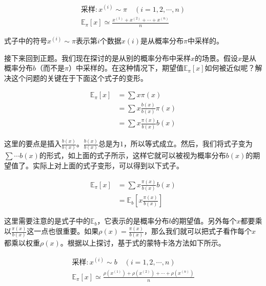 \documentclass[lang=cn,newtx,10pt,scheme=chinese]{elegantbook}
\begin{document}
\begin{equation}
\begin{aligned}
\text{采样}: x^{(i)}\sim\pi\quad (i=1,2,\cdots,n) \\
\mathbb{E}_\pi[x]\simeq\frac{x^{(1)}+x^{(2)}+\cdots+x^{(n)}}{n}
\end{aligned}
\end{equation}

式子中的符号$x^{(i)}\sim\pi$表示第$i$个数据$x(i)$是从概率分布$\pi$中采样的。

接下来回到正题。我们现在探讨的是从别的概率分布中采样$x$的场景。假设$x$是从概率分布$b$（而不是$\pi$）中采样的。在这种情况下，期望值$\mathbb{E}_\pi[x]$如何被近似呢？解决这个问题的关键在于下面这个式子的变形。

\begin{equation}
\begin{aligned}
\mathbb{E}_\pi[x] &= \sum x\pi(x) \\
&= \sum x \frac{b(x)}{b(x)}\pi(x) \\
&= \sum x \frac{\pi(x)}{b(x)}b(x)
\end{aligned}
\end{equation}

这里的要点是插入$\frac{b(x)}{b(x)}$。$\frac{b(x)}{b(x)}$总是为$1$，所以等式成立。然后，我们将式子变为$\sum\cdots b(x)$的形式，如上面的式子所示，这样它就可以被视为概率分布$b(x)$的期望值了。实际上对上面的式子变形，可以得到以下式子。

\begin{equation}
\begin{aligned}
\mathbb{E}_\pi[x] &= \sum x\frac{\pi(x)}{b(x)}b(x) \\
&= \mathbb{E}_b\left[ x\frac{\pi(x)}{b(x)} \right] 
\end{aligned}
\end{equation}

这里需要注意的是式子中的$\mathbb{E}_b$，它表示的是概率分布$b$的期望值。另外每个$x$都要乘以$\frac{\pi(x)}{b(x)}$这一点也很重要。如果$\rho(x)=\frac{\pi(x)}{b(x)}$，那么我们就可以把式子看作每个$x$都乘以权重$\rho(x)$。根据以上探讨，基于式的蒙特卡洛方法如下所示。

\begin{equation}
\begin{aligned}
\text{采样}: x^{(i)}\sim b\quad (i=1,2,\cdots,n) \\
\mathbb{E}_\pi[x]\simeq\frac{\rho(x^{(1)})+\rho(x^{(2)})+\cdots+\rho(x^{(n)})}{n}
\end{aligned}
\end{equation}
\end{document}
